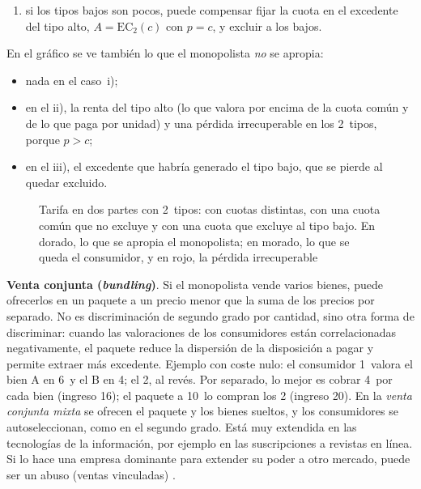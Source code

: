 \documentclass[11pt]{article}
\begin{document}
\begin{itemize}
\begin{enumerate}[label=\roman*)]
    subir $p$ por encima de $c$ resta algo de excedente al tipo bajo, y por tanto a la cuota, pero permite cobrar al alto, por unidad, parte de lo que no se le puede cobrar en la cuota;
  \item si los tipos bajos son pocos, puede compensar fijar la cuota en el excedente del tipo alto, $A=\mathrm{EC}_2(c)$ con $p=c$, y excluir a los bajos.
  \end{enumerate}
  En el gráfico se ve también lo que el monopolista \emph{no} se apropia:
  \begin{itemize}
  \item nada en el caso~i);
  \item en el ii), la renta del tipo alto (lo que valora por encima de la cuota común y de lo que paga por unidad) y una pérdida irrecuperable en los 2~tipos, porque $p>c$;
  \item en el iii), el excedente que habría generado el tipo bajo, que se pierde al quedar excluido.
  \end{itemize}
\end{itemize}

\begin{figure}[H]
\centering
\caption{Tarifa en dos partes con 2~tipos: con cuotas distintas, con una cuota común que no excluye y con una cuota que excluye al tipo bajo. En dorado, lo que se apropia el monopolista; en morado, lo que se queda el consumidor, y en rojo, la pérdida irrecuperable}\label{fig:tarifa-dos-partes}
\end{figure}

\begin{anotaciones}
\textbf{Venta conjunta (\emph{bundling})}. Si el monopolista vende varios bienes, puede ofrecerlos en un paquete a un precio menor que la suma de los precios por separado. No es discriminación de segundo grado por cantidad, sino otra forma de discriminar: cuando las valoraciones de los consumidores están correlacionadas negativamente, el paquete reduce la dispersión de la disposición a pagar y permite extraer más excedente\nocite{AdamsYellen1976Commodity}. Ejemplo con coste nulo: el consumidor 1~valora el bien A en 6~y el B en 4; el 2, al revés. Por separado, lo mejor es cobrar 4~por cada bien (ingreso 16); el paquete a 10~lo compran los 2 (ingreso 20). En la \emph{venta conjunta mixta} se ofrecen el paquete y los bienes sueltos, y los consumidores se autoseleccionan, como en el segundo grado. Está muy extendida en las tecnologías de la información, por ejemplo en las suscripciones a revistas en línea. Si lo hace una empresa dominante para extender su poder a otro mercado, puede ser un abuso (ventas vinculadas) .
\end{anotaciones}
\end{document}
